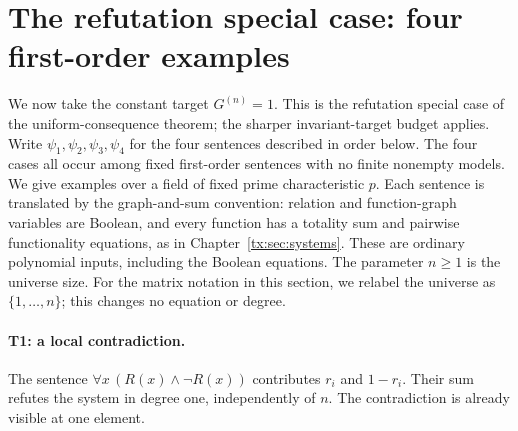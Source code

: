 \section{The refutation special case: four first-order examples}
\label{tx:sec:examples}

We now take the constant target $G^{(n)}=1$. This is the refutation special
case of the uniform-consequence theorem; the sharper invariant-target
budget applies. Write $\psi_1,\psi_2,\psi_3,\psi_4$ for the four sentences described in order below.
The four cases all occur among fixed first-order sentences with no finite
nonempty models. We give examples over a field of fixed prime characteristic
$p$. Each sentence is translated by the graph-and-sum convention: relation
and function-graph variables are Boolean, and every function has a totality
sum and pairwise functionality equations, as in
Chapter~\ref{tx:sec:systems}. These are ordinary polynomial inputs,
including the Boolean equations. The parameter $n\geq1$ is the
universe size. For the matrix notation in this section, we relabel the
universe as $\{1,\ldots,n\}$; this changes no equation or degree.

\paragraph{T1: a local contradiction.}
The sentence $\forall x\,(R(x)\wedge\neg R(x))$ contributes $r_i$ and
$1-r_i$. Their sum refutes the system in degree one, independently of $n$.
The contradiction is already visible at one element.

